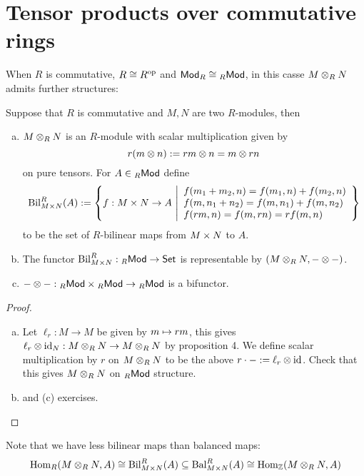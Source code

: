\documentclass[a4paper]{report}
\begin{document}
\section{Tensor products over commutative rings}
When $R$ is commutative, $R \cong R^\mathrm{op}$ and $\mathsf{Mod}_R \cong {}_R\mathsf{Mod}$, in this casse $M \otimes_{R} N$ admits further structures:
\begin{prop}
  Suppose that $R$ is commutative and $M, N$ are two $R$-modules, then
  \begin{enumerate}[(a)]
\item $M \otimes_{R} N$  is an $R$-module with scalar multiplication given by \[r(m\otimes n) := rm \otimes n = m \otimes rn\]on pure tensors. For $A \in {}_R\mathsf{Mod}$ define \[\Bil_{M \tm N}^{R}(A):= \l\{ f: M \tm N \to A \ \middle \vert \begin{array}{l}
f(m_{1}+m_{2}, n) = f(m_{1}, n) + f(m_{2},n) \\
  f(m, n_{1}+n_{2}) = f(m, n_{1}) + f(m, n_{2}) \\
  f(rm,n) = f(m,rn) = rf(m,n)
\end{array} \r\}\]
          to be the set of $R$-bilinear maps from $M \times N$ to $A$.
    \item The functor $\operatorname{Bil}_{M \times N}^{R}: {}_R\mathsf{Mod} \to \mathsf{Set}$ is representable by $(M \otimes_{R} N, - \otimes -)$.
          \item $- \otimes -: {}_R\mathsf{Mod} \times {}_R\mathsf{Mod} \to {}_R\mathsf{Mod}$ is a bifunctor.
  \end{enumerate}
  \begin{proof}
    \begin{enumerate}[(a)]
      \item   Let $\ell_{r}: M \to M$ be given by $m \mapsto rm$, this gives $\ell_{r} \otimes \operatorname{id}_{N} : M \otimes_{R} N \to M \otimes_{R} N$ by proposition 4. We define scalar multiplication by $r$ on $M \otimes_{R} N$ to be the above $r \cdot - := \ell_{r} \otimes \operatorname{id}$. Check that this gives $M \otimes_{R} N$ on ${}_R\mathsf{Mod}$ structure.
            \item and (c) exercises.
    \end{enumerate}
  \end{proof}
\end{prop}
\begin{rem*}
  Note that we have less bilinear maps than balanced maps:
  \[\operatorname{Hom}_{R}(M \otimes_{R} N, A) \cong \operatorname{Bil}_{M \times N}^{R}(A) \subseteq \operatorname{Bal}_{M \times N}^{R}(A) \cong \operatorname{Hom}_{\mathbb{Z}}(M \otimes_{R} N, A)\]

\end{rem*}
\end{document}
